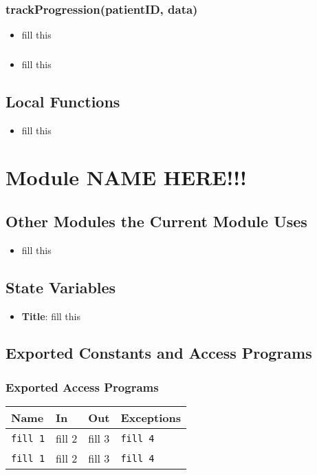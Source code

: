 \documentclass[12pt, titlepage]{article}
\begin{document}
\subsubsection{trackProgression(patientID, data)}

\begin{itemize}
    \item fill this
\end{itemize}

\subsubsection{}

\begin{itemize}
    \item fill this
\end{itemize}


\subsection{Local Functions}
\begin{itemize}
    \item fill this
\end{itemize}
\section{Module NAME HERE!!!}

\subsection{Other Modules the Current Module Uses}
\begin{itemize}
    \item fill this 
\end{itemize}

\subsection{State Variables}
\begin{itemize}
    \item \textbf{Title}: fill this 
\end{itemize}

\subsection{Exported Constants and Access Programs}
\subsubsection{Exported Access Programs}
\begin{tabular}{|l|l|l|l|}
    \hline
    \textbf{Name} & \textbf{In} & \textbf{Out} & \textbf{Exceptions} \\
    \hline 
    \texttt{fill 1} & fill 2 & fill 3 & \texttt{fill 4} \\
    \hline
    \texttt{fill 1} & fill 2 & fill 3 & \texttt{fill 4} \\
    \hline
\end{tabular}
\end{document}
